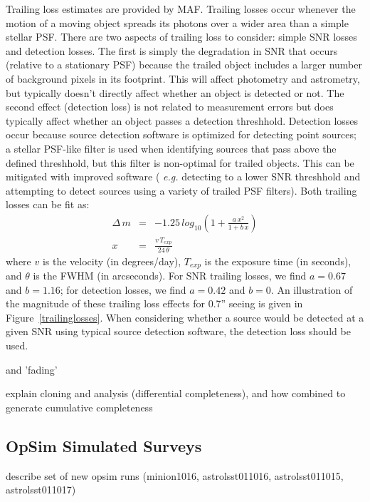 Trailing loss estimates are provided by MAF. Trailing losses occur whenever the motion of a moving object spreads its photons over a wider area than a simple stellar PSF. There are two aspects
of trailing loss to consider: simple SNR losses and detection losses.
The first is simply the degradation in SNR that occurs (relative to a
stationary PSF) because the trailed object includes a larger number of
background pixels in its footprint. This will affect photometry and
astrometry, but typically doesn't directly affect whether an object is
detected or not. The second effect (detection loss) is not related to
measurement errors but does typically affect whether an object passes
a detection threshhold. Detection losses occur because source
detection software is optimized for detecting point sources;
a stellar PSF-like filter is used when identifying sources that pass
above the defined threshhold, but this filter is non-optimal for
trailed objects. This can be mitigated with improved software ({\it                                                                               
e.g.} detecting to a lower SNR threshhold and attempting to detect
sources using a variety of trailed PSF filters). Both trailing losses can
be fit as:
\begin{eqnarray}
\Delta \, m & = &-1.25 \, log_{10} \left( 1 + \frac{a \, x^2} { 1 + b\,
    x} \right) \\
x & = & \frac{v \, T_{exp}} {24 \, \theta} 
\end{eqnarray}
where $v$ is the velocity (in degrees/day), $T_{exp}$ is the exposure
time (in seconds), and $\theta$ is the FWHM (in arcseconds). For
SNR trailing losses, we find $a = 0.67$ and $b = 1.16$; for
detection losses, we find $a=0.42$ and $b=0$. An illustration of the
magnitude of these trailing loss effects for 0.7'' seeing is given in
Figure~\ref{trailinglosses}. When considering whether a source would
be detected at a given SNR using typical source detection software,
the detection loss should be used.


and 'fading'

explain cloning and analysis (differential completeness), and how combined to generate cumulative completeness


\subsection{OpSim Simulated Surveys}

describe set of new opsim runs (minion1016, astrolsst011016, astrolsst011015, astrolsst011017)



